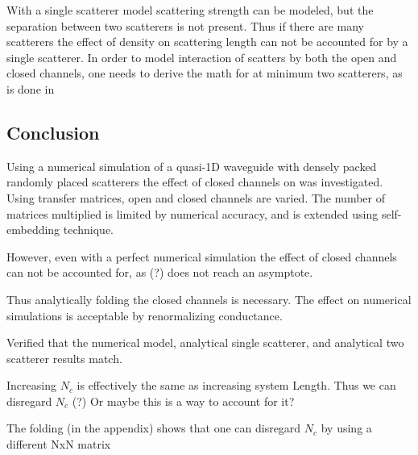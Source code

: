 With a single scatterer model scattering strength can be modeled, 
but the separation between two scatterers is not present. Thus if 
there are many scatterers the effect of density on scattering length can not
be accounted for by a single scatterer. In order to model interaction of 
scatters by both the open and closed channels, one needs to derive the math
for at minimum two scatterers, as is done in %

\subsection {Conclusion}

Using a numerical simulation of a quasi-1D waveguide with densely packed
randomly placed scatterers the effect of closed channels on was investigated.
Using transfer matrices, open and closed channels are varied.  The number of
matrices multiplied is limited by numerical accuracy, and is extended using self-embedding technique.

However, even with a perfect numerical simulation the effect of closed channels
can not be accounted for, as (?) does not reach an asymptote.

Thus analytically folding the closed channels is necessary.  The effect on 
numerical simulations is acceptable by renormalizing conductance.

Verified that the numerical model, analytical single scatterer, and 
analytical two scatterer results match.


Increasing $N_c$ is effectively the same as increasing system Length. Thus we can 
disregard $N_c$ (?) Or maybe this is a way to account for it?

The folding (in the appendix) shows that one can disregard $N_c$ by using a 
different NxN matrix

